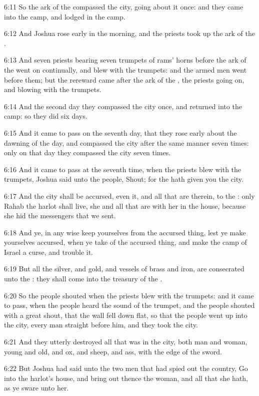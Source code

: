 6:11 So the ark of the \LORD compassed the city, going about it once:
and they came into the camp, and lodged in the camp.

6:12 And Joshua rose early in the morning, and the priests took up the
ark of the \LORD.

6:13 And seven priests bearing seven trumpets of rams' horns before
the ark of the \LORD went on continually, and blew with the trumpets:
and the armed men went before them; but the rereward came after the
ark of the \LORD, the priests going on, and blowing with the trumpets.

6:14 And the second day they compassed the city once, and returned
into the camp: so they did six days.

6:15 And it came to pass on the seventh day, that they rose early
about the dawning of the day, and compassed the city after the same
manner seven times: only on that day they compassed the city seven
times.

6:16 And it came to pass at the seventh time, when the priests blew
with the trumpets, Joshua said unto the people, Shout; for the \LORD
hath given you the city.

6:17 And the city shall be accursed, even it, and all that are
therein, to the \LORD: only Rahab the harlot shall live, she and all
that are with her in the house, because she hid the messengers that we
sent.

6:18 And ye, in any wise keep yourselves from the accursed thing, lest
ye make yourselves accursed, when ye take of the accursed thing, and
make the camp of Israel a curse, and trouble it.

6:19 But all the silver, and gold, and vessels of brass and iron, are
consecrated unto the \LORD: they shall come into the treasury of the
\LORD.

6:20 So the people shouted when the priests blew with the trumpets:
and it came to pass, when the people heard the sound of the trumpet,
and the people shouted with a great shout, that the wall fell down
flat, so that the people went up into the city, every man straight
before him, and they took the city.

6:21 And they utterly destroyed all that was in the city, both man and
woman, young and old, and ox, and sheep, and ass, with the edge of the
sword.

6:22 But Joshua had said unto the two men that had spied out the
country, Go into the harlot's house, and bring out thence the woman,
and all that she hath, as ye sware unto her.

